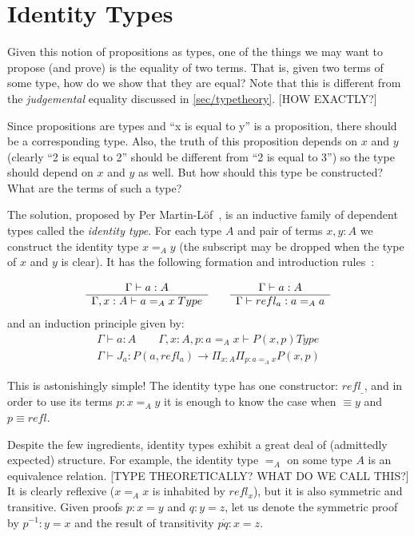 \section{Identity Types}\label{sec/identitytypes}

Given this notion of propositions as types, one of the things we may want to
propose (and prove) is the equality of two terms. That is, given two terms of
some type, how do we show that they are equal? Note that this is different from
the \emph{judgemental} equality discussed in \autoref{sec/typetheory}. [HOW EXACTLY?]

Since propositions are types and ``x is equal to y'' is a proposition, there
should be a corresponding type. Also, the truth of this proposition depends on
$x$ and $y$ (clearly ``2 is equal to 2'' should be different from ``2 is equal
to 3'') so the type should depend on $x$ and $y$ as well. But how should this
type be constructed? What are the terms of such a type?

The solution, proposed by Per Martin-Löf~\cite{ML75}, is an inductive family of dependent
types called the \emph{identity type}. For each type $A$ and pair of terms
$x,y:A$ we construct the identity type $x =_A y$ (the subscript may be dropped
when the type of $x$ and $y$ is clear). It has the following formation and introduction
rules~\cite{Rijke2019}:

\[
  \begin{array}[t]{c}
    \Gamma \vdash a:A\\
    \hline
    \Gamma, x:A \vdash a =_A x \; Type\\
  \end{array}
  \qquad
  \begin{array}[t]{c}
    \Gamma \vdash a:A\\
    \hline
    \Gamma \vdash refl_a : a =_A a
  \end{array}
\]
and an induction principle given by:
\[
  \begin{array}{c}
    \Gamma \vdash a:A \qquad \Gamma, x:A, p:a =_A x \vdash P (x,p) Type\\
    \hline
    \Gamma \vdash J_a : P (a, refl_a) \rightarrow \Pi_{x:A}\Pi_{p:a=_Ax}P
    (x, p)
  \end{array}
\]

This is astonishingly simple! The identity type has one constructor: $refl_{\_}$,
and in order to use its terms $p : x =_A y$ it is enough to know the case when $
\equiv y$ and $p \equiv refl$.

Despite the few ingredients, identity types exhibit a great deal of (admittedly
expected) structure. For example, the identity type $=_A$ on some type $A$ is an
equivalence relation. [TYPE THEORETICALLY? WHAT DO WE CALL THIS?] It is clearly
reflexive ($x =_A x$ is inhabited by $refl_x$), but it is also symmetric and
transitive. Given proofs $p : x = y$ and $q : y = z$, let us denote the
symmetric proof by $p^{-1} : y = x$ and the result of transitivity $p \dot q : x
= z$.

